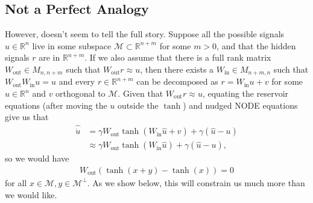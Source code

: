 \documentclass[12pt,oneside]{article}
\theoremstyle{plain}
\newcommand{\Wout}{W_{\text{out}}}
\newcommand{\Win}{W_{\text{in}}}%
\begin{document}
\subsection{Not a Perfect Analogy}
However, doesn't seem to tell the full story. Suppose all the possible signals $u\in\mathbb{R}^{n}$ live in some subspace $\mathcal{M}\subset \mathbb{R}^{n+m}$ for some $m > 0$, and that the hidden signals $r$ are in $\mathbb{R}^{n+m}$. If we also assume that there is a full rank matrix $\Wout\in M_{n, n+m}$ such that $\Wout r \approx u$, then there exists a $\Win\in M_{n+m, n}$ such that $\Wout \Win u = u$ and every $r\in \mathbb{R}^{n+m}$ can be decomposed as $r = \Win u + v$ for some $u\in\mathbb{R}^n$ and $v$ orthogonal to $\mathcal{M}$.  Given that $\Wout r\approx u$, equating the reservoir equations (after moving the $u$ outside the $\tanh$) and nudged NODE equations give us that
\begin{align*}
    \hat{\dot u} &= \gamma \Wout \tanh(\Win \hat u + v) + \gamma(\hat u - u)
    \\
    &\approx \gamma \Wout \tanh(\Win \hat u) + \gamma(\hat u - u),
\end{align*}
so we would have
\begin{align}
    \Wout ( \tanh(x + y) - \tanh(x)) = 0 \label{bad}
\end{align}
for all $x\in \mathcal{M}, y\in \mathcal{M}^\perp$. As we show below, this will constrain us much more than we would like. 
\end{document}
